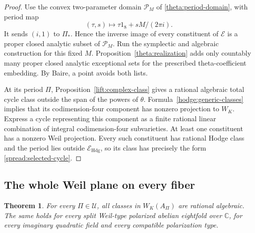 \documentclass[11pt]{article}
\newtheorem{theorem}{Theorem}[section]
\theoremstyle{definition}
\theoremstyle{remark}
\newcommand{\C}{\mathbb C}
\numberwithin{equation}{section}
\begin{document}
\begin{proof}
Use the convex two-parameter domain $\mathcal P_M$ of
\eqref{theta:period-domain}, with period map
\[
 (\tau,s)\longmapsto\tau1_8+sM/(2\pi i).
\]
It sends $(i,1)$ to $\Pi_*$.  Hence the inverse image of every
constituent of $\mathcal E$ is a proper closed analytic subset of
$\mathcal P_M$.  Run the symplectic and algebraic construction for
this fixed $M$.  Proposition~\ref{theta:realization} adds only countably
many proper closed analytic exceptional sets for the prescribed
theta-coefficient embedding.  By Baire, a point avoids both lists.

At its period $\Pi$, Proposition~\ref{lift:complex-class} gives a
rational algebraic total cycle class outside the span of the powers
of $\theta$.  Formula~\eqref{hodge:generic-classes} implies that its
codimension-four component has nonzero projection to $W_K$.
Express a cycle representing this component as a finite rational
linear combination of integral codimension-four subvarieties.  At least
one constituent has a nonzero Weil projection.  Every such constituent
has rational Hodge class and the period lies outside
$\mathcal E_{\mathrm{Hdg}}$, so its class has precisely the form
\eqref{spread:selected-cycle}.
\end{proof}

\subsection{The whole Weil plane on every fiber}

\begin{theorem}
\label{spread:all-fibers}
For every $\Pi\in\mathcal U$, all classes in $W_K(A_\Pi)$ are
rational algebraic.  The same holds for every split Weil-type
polarized abelian eightfold over $\C$, for every imaginary quadratic
field and every compatible polarization type.
\end{theorem}
\end{document}
